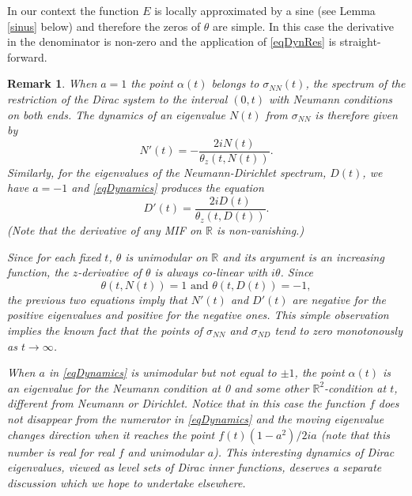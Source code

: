 \documentclass[11pt,twoside,reqno]{amsart}
\def\to{\rightarrow}
\def\R{{\mathbb R}}
\def\a{\alpha}
\theoremstyle{plain}
\newtheorem{remark}{Remark}
\numberwithin{equation}{section}
\begin{document}
In our context the function $E$ is locally approximated by a sine (see Lemma \ref{sinus} below) and
therefore the zeros of $\theta$ are simple. In this case the derivative in the denominator is non-zero and  the application of \eqref{eqDynRes}
is straight-forward.

\begin{remark}\label{remND}
When $a=1$ the point $\a(t)$ belongs to $\sigma_{NN}(t)$, the spectrum of the restriction of the Dirac system
to the interval $(0,t)$ with Neumann conditions on both ends. The dynamics of an eigenvalue $N(t)$ from $\sigma_{NN}$ is
therefore given by
$$N'(t)=-\frac{2i N(t)}{\theta_z(t,N(t))}.$$
Similarly, for the eigenvalues of the Neumann-Dirichlet spectrum, $D(t)$,
we have $a=-1$ and \eqref{eqDynamics} produces the equation
$$D'(t)=\frac{2i D(t)}{\theta_z(t,D(t))}.$$
(Note that the derivative of any MIF on $\R$ is non-vanishing.)

Since for each fixed $t$, $\theta$ is unimodular on $\R$ and its argument is an increasing function, the $z$-derivative of $\theta$ is always
co-linear with $i\theta$. Since $$\theta(t,N(t))=1\textrm{ and }\theta(t,D(t))=-1,$$ the previous two equations imply that $N'(t)$ and $D'(t)$ are negative for the positive eigenvalues and positive
for the negative ones.
This simple observation  implies the known fact that the points of $\sigma_{NN}$ and
$\sigma_{ND}$ tend to zero monotonously as $t\to \infty$.

When $a$ in \eqref{eqDynamics} is unimodular but not equal to $\pm 1$, the point
$\a(t)$ is an eigenvalue for the Neumann condition at 0 and some other $\R^2$-condition at $t$, different from Neumann or Dirichlet. Notice that in this case
the function $f$ does not disappear from the numerator in \eqref{eqDynamics} and the moving eigenvalue changes direction when it
reaches the point $f(t)(1-a^2)/2i a$ (note that this number is real for real $f$ and unimodular $a$). This interesting dynamics of Dirac eigenvalues, viewed as level sets of Dirac inner functions, deserves a separate discussion which we hope to undertake elsewhere.
\end{remark}

\end{document}
